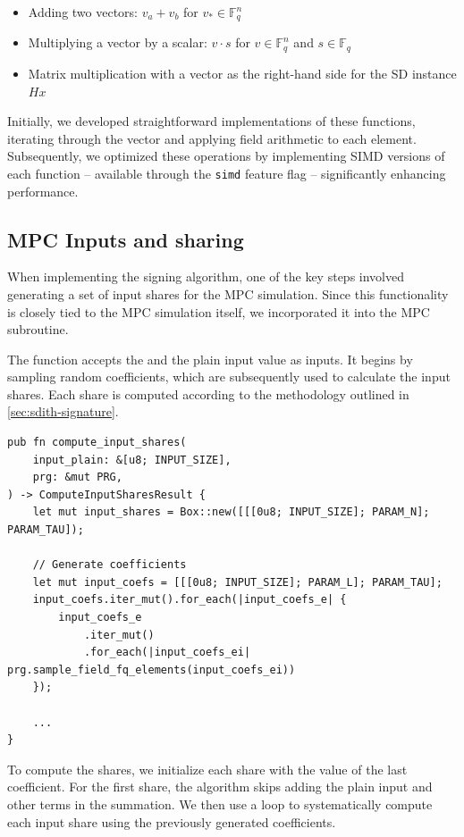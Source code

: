 \documentclass[11pt]{report}
\theoremstyle{definition}
\theoremstyle{plain}
\begin{document}
\begin{itemize}
  \item Adding two vectors: $v_a + v_b$ for $v_* \in \mathbb{F}_{q}^n$
  \item Multiplying a vector by a scalar: $v \cdot s$ for $v \in \mathbb{F}_{q}^n$ and $s \in \mathbb{F}_{q}$
  \item Matrix multiplication with a vector as the right-hand side for the SD instance $Hx$
\end{itemize}

Initially, we developed straightforward implementations of these functions, iterating through the vector and applying field arithmetic to each element. Subsequently, we optimized these operations by implementing SIMD versions of each function -- available through the \texttt{simd} feature flag -- significantly enhancing performance.

\subsection{MPC Inputs and sharing}
When implementing the signing algorithm, one of the key steps involved generating a set of input shares for the MPC simulation. Since this functionality is closely tied to the MPC simulation itself, we incorporated it into the MPC subroutine.

The function accepts the  and the plain input value as inputs. It begins by sampling random coefficients, which are subsequently used to calculate the input shares. Each share is computed according to the methodology outlined in \autoref{sec:sdith-signature}.

\begin{verbatim}
pub fn compute_input_shares(
    input_plain: &[u8; INPUT_SIZE],
    prg: &mut PRG,
) -> ComputeInputSharesResult {
    let mut input_shares = Box::new([[[0u8; INPUT_SIZE]; PARAM_N]; PARAM_TAU]);

    // Generate coefficients
    let mut input_coefs = [[[0u8; INPUT_SIZE]; PARAM_L]; PARAM_TAU];
    input_coefs.iter_mut().for_each(|input_coefs_e| {
        input_coefs_e
            .iter_mut()
            .for_each(|input_coefs_ei| prg.sample_field_fq_elements(input_coefs_ei))
    });

    ...
}
\end{verbatim}

To compute the shares, we initialize each share with the value of the last coefficient. For the first share, the algorithm skips adding the plain input and other terms in the summation. We then use a loop to systematically compute each input share using the previously generated coefficients.
\end{document}
